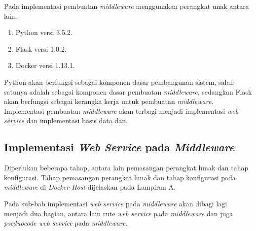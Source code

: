 Pada implementasi pembuatan \textit{middleware} menggunakan perangkat unak antara lain:
\begin{enumerate}
	\item Python versi 3.5.2.
	\item Flask versi 1.0.2.
	\item Docker versi 1.13.1.
\end{enumerate}

Python akan berfungsi sebagai komponen dasar pembangunan sistem, salah satunya adalah sebagai komponen dasar pembuatan \textit{middleware}, sedangkan Flask akan berfungsi sebagai kerangka kerja untuk pembuatan \textit{middleware}. Implementasi pembuatan \textit{middleware} akan terbagi menjadi implementasi \textit{web service} dan implementasi basis data dan.

\subsection{Implementasi \textit{Web Service} pada \textit{Middleware}}
Diperlukan beberapa tahap, antara lain pemasangan perangkat lunak dan tahap konfigurasi. Tahap pemasangan perangkat lunak dan tahap konfigurasi pada \textit{middleware} di \textit{Docker Host} dijelaskan pada Lampiran A.

Pada sub-bab implementasi \textit{web service} pada \textit{middleware} akan dibagi lagi menjadi dua bagian, antara lain rute \textit{web service} pada \textit{middleware} dan juga \textit{pseduocode web service} pada \textit{middleware}.

